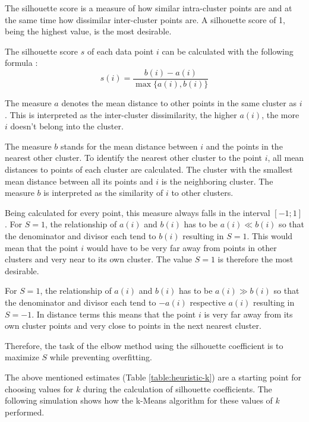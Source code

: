 The silhouette score is a measure of how similar intra-cluster points are and at the same time how dissimilar inter-cluster points are. A silhouette score of 1, being the highest value, is the most desirable.

The silhouette score $s$ of each data point $i$ can be calculated with the following formula \cite[p.~94]{kodinariyaReviewDeterminingCluster2013}:
\[ s(i) = \frac{b(i) - a(i)}{\max\{a(i),b(i)\}} \]

The measure $a$ denotes the mean distance to other points in the same cluster as $i$. This is interpreted as the inter-cluster dissimilarity, the higher $a(i)$, the more $i$ doesn't belong into the cluster.

The measure $b$ stands for the mean distance between $i$ and the points in the nearest other cluster. To identify the nearest other cluster to the point $i$, all mean distances to points of each cluster are calculated. The cluster with the smallest mean distance between all its points and $i$ is the neighboring cluster. The measure $b$ is interpreted as the similarity of $i$ to other clusters.

Being calculated for every point, this measure always falls in the interval $[-1;1]$. For $S = 1$, the relationship of $a(i)$ and $b(i)$ has to be $a(i) \ll b(i)$ so that the denominator and divisor each tend to $b(i)$ resulting in $S = 1$. This would mean that the point $i$ would have to be very far away from points in other clusters and very near to its own cluster. The value $S = 1$ is therefore the most desirable.

For $S = 1$, the relationship of $a(i)$ and $b(i)$ has to be $a(i) \gg b(i)$ so that the denominator and divisor each tend to $-a(i)$ respective $a(i)$ resulting in $S = -1$. In distance terms this means that the point $i$ is very far away from its own cluster points and very close to points in the next nearest cluster.

Therefore, the task of the elbow method using the silhouette coefficient is to maximize $S$ while preventing overfitting.

The above mentioned estimates (Table \ref{table:heuristic-k}) are a starting point for choosing values for $k$ during the calculation of silhouette coefficients. The following simulation shows how the k-Means algorithm for these values of $k$ performed.

